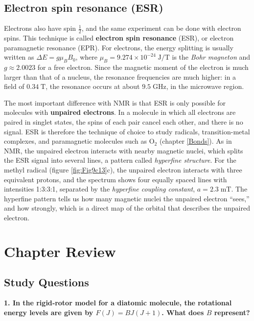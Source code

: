 \documentclass[
  english,
  9pt,
]{extbook}
\theoremstyle{definition}
\theoremstyle{definition}
\theoremstyle{definition}
\theoremstyle{definition}
\theoremstyle{remark}
\begin{document}
\subsection{Electron spin resonance (ESR)}\label{electron-spin-resonance-esr}

Electrons also have spin \(\frac{1}{2}\), and the same experiment can be done with electron spins. This technique is called \textbf{electron spin resonance} (ESR), or electron paramagnetic resonance (EPR). For electrons, the energy splitting is usually written as \(\Delta E=g\mu_B B_0\), where \(\mu_B=9.274\times10^{-24}\;\text{J/T}\) is the \emph{Bohr magneton} and \(g\approx2.0023\) for a free electron. Since the magnetic moment of the electron is much larger than that of a nucleus, the resonance frequencies are much higher: in a field of \(0.34\;\text{T}\), the resonance occurs at about \(9.5\;\text{GHz}\), in the microwave region.

The most important difference with NMR is that ESR is only possible for molecules with \textbf{unpaired electrons}. In a molecule in which all electrons are paired in singlet states, the spins of each pair cancel each other, and there is no signal. ESR is therefore the technique of choice to study radicals, transition-metal complexes, and paramagnetic molecules such as \(\mathrm{O_2}\) (chapter \ref{Bonds}). As in NMR, the unpaired electron interacts with nearby magnetic nuclei, which splits the ESR signal into several lines, a pattern called \emph{hyperfine structure}. For the methyl radical (figure \ref{fig:Fig9c13}c), the unpaired electron interacts with three equivalent protons, and the spectrum shows four equally spaced lines with intensities 1:3:3:1, separated by the \emph{hyperfine coupling constant}, \(a=2.3\;\text{mT}\). The hyperfine pattern tells us how many magnetic nuclei the unpaired electron ``sees,'' and how strongly, which is a direct map of the orbital that describes the unpaired electron.

\section{Chapter Review}\label{rev13}

\subsection{Study Questions}\label{quest13}

\textbf{1. In the rigid‑rotor model for a diatomic molecule, the rotational energy levels are given by \(F(J) = B J(J+1)\). What does \(B\) represent?}
\end{document}
